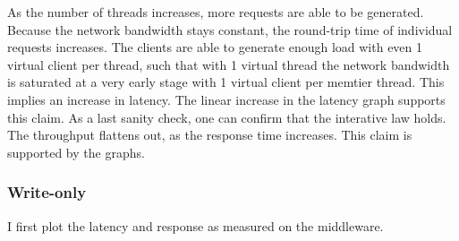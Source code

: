 \documentclass[11pt,a4paper]{article}
\begin{document}
As the number of threads increases, more requests are able to be generated.
Because the network bandwidth stays constant, the round-trip time of individual requests increases.
The clients are able to generate enough load with even 1 virtual client per thread, such that with 1 virtual thread the network bandwidth is saturated at a very early stage with 1 virtual client per memtier thread.
This implies an increase in latency.
The linear increase in the latency graph supports this claim.
As a last sanity check, one can confirm that the interative law holds.
The throughput flattens out, as the response time increases.
This claim is supported by the graphs.


\subsubsection{Write-only}

I first plot the latency and response as measured on the middleware.
\end{document}
